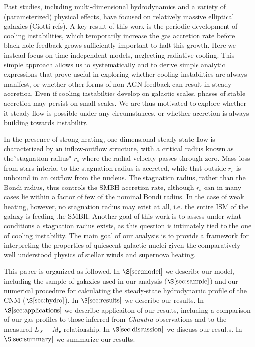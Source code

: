 \documentclass[usenatbib,fleqn]{mn2e}
\newcommand{\rs}{r_s}
\newcommand{\Mbh}[1][]{M_{\bullet#1}}
\begin{document}
Past studies, including multi-dimensional hydrodynamics and a variety of (parameterized) physical effects, have focused on relatively massive elliptical galaxies (Ciotti refs).  A key result of this work is the periodic development of cooling instabilities, which temporarily increase the gas accretion rate before black hole feedback grows sufficiently important to halt this growth.  Here we instead focus on time-independent models, neglecting radiative cooling.  This simple approach allows us to systematically and to derive simple analytic expressions that prove useful in exploring whether cooling instabilties are always manifest, or whether other forms of non-AGN feedback can result in steady accretion.  Even if cooling instabilties develop on galactic scales, phases of stable accretion may persist on small scales.  We are thus motivated to explore whether it steady-flow is possible under any circumstances, or whether accretion is always building towards instability.

In the presence of strong heating, one-dimensional steady-state flow is characterized by an inflow-outflow structure, with a critical radius known as the``stagnation radius" $\rs$ where the radial velocity passes through zero.  Mass loss from stars interior to the stagnation radius is accreted, while that outside $\rs$ is unbound in an outflow from the nucleus.  The stagnation radius, rather than the Bondi radius, thus controls the SMBH accretion rate, although $\rs$ can in many cases lie within a factor of few of the nominal Bondi radius.  In the case of weak heating, however, no stagnation radius may exist at all, i.e. the entire ISM of the galaxy is feeding the SMBH.  Another goal of this work is to assess under what conditions a stagnation radius exists, as this question is intimately tied to the one of cooling instability.  
The main goal of our analysis is to provide a framework for
interpreting the properties of quiescent galactic nuclei given the
comparatively well understood physics of stellar winds and supernova
heating.

This paper is organized as followed.  In $\S\ref{sec:model}$ we
describe our model, including the sample of galaxies used in our
analysis ($\S\ref{sec:sample}$) and our numerical procedure for
calculating the steady-state hydrodynamic profile of the CNM
($\S\ref{sec:hydro}$).  In $\S\ref{sec:results}$ we describe our
results.  In $\S\ref{sec:applications}$ we describe applicaiton of our
results, including a comparison of our gas profiles to those inferred
from {\it Chandra} observations and to the measured $L_X-\Mbh$
relationship.  In $\S\ref{sec:discussion}$ we discuss our results.  In
$\S\ref{sec:summary}$ we summarize our results.
\end{document}
